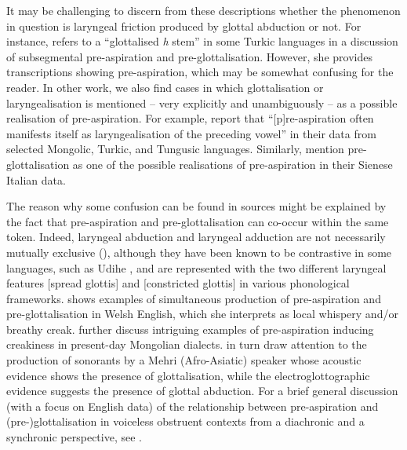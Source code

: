 \documentclass[output=paper]{langscibook}
\begin{document}
It may be challenging to discern from these descriptions whether the phenomenon in question is laryngeal friction produced by glottal abduction or not. For instance, \citet[427]{Dwyer2000} refers to a “glottalised \textit{h} stem” in some Turkic languages in a discussion of subsegmental pre\hyp aspiration and pre\hyp glottalisation. However, she provides transcriptions showing pre\hyp aspiration, which may be somewhat confusing for the reader. In other work, we also find cases in which glottalisation or laryngealisation is mentioned – very explicitly and unambiguously – as a possible realisation of pre-aspiration. For example, \citet[4]{KarlssonSvantesson2012} report that “[p]re-aspiration often manifests itself as laryngealisation of the preceding vowel” in their data from selected Mongolic, Turkic, and Tungusic languages. Similarly, \citet{StevensHajek2007} mention pre-glottalisation as one of the possible realisations of pre\hyp aspiration in their Sienese Italian data.

The reason why some confusion can be found in sources might be explained by the fact that pre\hyp aspiration and pre\hyp glottalisation can co-occur within the same token. Indeed, laryngeal abduction and laryngeal adduction are not necessarily mutually exclusive (\citealt{Hejná2023, MoisikEtAl2022}), although they have been known to be contrastive in some languages, such as Udihe \citep{Kuznetsova2022}, and are represented with the two different laryngeal features [spread glottis] and [constricted glottis] in various phonological frameworks. \citet{Hejná2023} shows examples of simultaneous production of pre\hyp aspiration and pre\hyp glottalisation in Welsh English, which she interprets as local whispery and/or breathy creak. \citet{KarlssonSvantesson2011} further discuss intriguing examples of pre\hyp aspiration inducing creakiness in present-day Mongolian dialects.  in turn draw attention to the production of sonorants by a Mehri (Afro-Asiatic) speaker whose acoustic evidence shows the presence of glottalisation, while the electroglottographic evidence suggests the presence of glottal abduction. For a brief general discussion (with a focus on English data) of the relationship between pre\hyp aspiration and (pre-)glottalisation in voiceless obstruent contexts from a diachronic and a synchronic perspective, see \citet[Ch. 5]{Hejná2015}.
\end{document}
